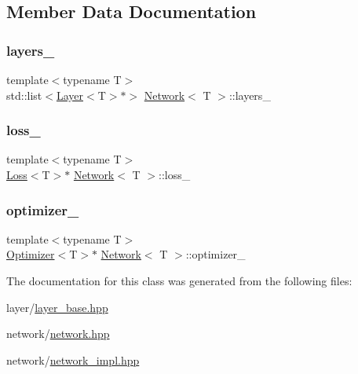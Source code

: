 \subsection{Member Data Documentation}
\mbox{\label{class_network_a44ed9431544add6652254104c3413d4c}} 
\subsubsection{\texorpdfstring{layers\_}{layers\_}}
{\footnotesize\ttfamily template$<$typename T$>$ \\
std\+::list$<$\mbox{\hyperlink{class_layer}{Layer}}$<$T$>$$\ast$$>$ \mbox{\hyperlink{class_network}{Network}}$<$ T $>$\+::layers\+\_\+\hspace{0.3cm}{\ttfamily [protected]}}

\mbox{\label{class_network_a1445c84bc4a3f14a71e982c1c2bef76d}} 
\subsubsection{\texorpdfstring{loss\_}{loss\_}}
{\footnotesize\ttfamily template$<$typename T$>$ \\
\mbox{\hyperlink{class_loss}{Loss}}$<$T$>$$\ast$ \mbox{\hyperlink{class_network}{Network}}$<$ T $>$\+::loss\+\_\+\hspace{0.3cm}{\ttfamily [protected]}}

\mbox{\label{class_network_a41e9d6851a95074ffec5e66b78deb9b7}} 
\subsubsection{\texorpdfstring{optimizer\_}{optimizer\_}}
{\footnotesize\ttfamily template$<$typename T$>$ \\
\mbox{\hyperlink{class_optimizer}{Optimizer}}$<$T$>$$\ast$ \mbox{\hyperlink{class_network}{Network}}$<$ T $>$\+::optimizer\+\_\+\hspace{0.3cm}{\ttfamily [protected]}}



The documentation for this class was generated from the following files\+:\begin{DoxyCompactItemize}
\item 
layer/\mbox{\hyperlink{layer__base_8hpp}{layer\+\_\+base.\+hpp}}\item 
network/\mbox{\hyperlink{network_8hpp}{network.\+hpp}}\item 
network/\mbox{\hyperlink{network__impl_8hpp}{network\+\_\+impl.\+hpp}}\end{DoxyCompactItemize}
